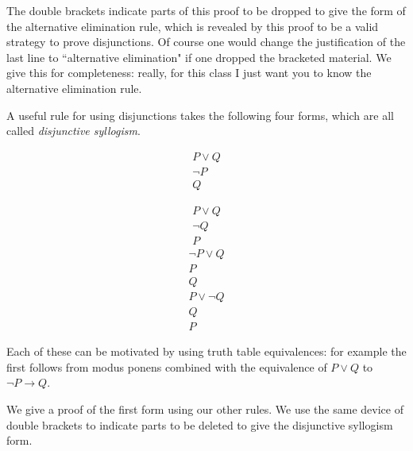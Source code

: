 \documentclass[12pt]{article}
\begin{document}
The double brackets indicate parts of this proof to be dropped to give the form of the alternative elimination rule, which is revealed by this proof to be a valid strategy to prove disjunctions.  Of course one would change the justification of the last line to ``alternative elimination" if one dropped the bracketed material.  We give this for completeness:  really, for this class I just want you to know the alternative elimination rule.

A useful rule for using disjunctions takes the following four forms, which are all called {\em disjunctive syllogism\/}.

$$\begin{array}{c}

P \vee Q \\ 

\neg P \\ \hline

Q
\end{array}$$


$$\begin{array}{c}

P \vee Q \\ 

\neg Q \\ \hline

P
\end{array}$$$$\begin{array}{c}

\neg P \vee Q \\ 

P \\ \hline

Q
\end{array}$$$$\begin{array}{c}

P \vee \neg Q \\ 

Q \\ \hline

P
\end{array}$$

Each of these can be motivated by using truth table equivalences:  for example the first follows from modus ponens combined with the equivalence of $P \vee Q$ to
$\neg P \rightarrow Q$.

We give a proof of the first form using our other rules.  We use the same device of double brackets to indicate parts to be deleted to give the disjunctive syllogism form.
\end{document}
